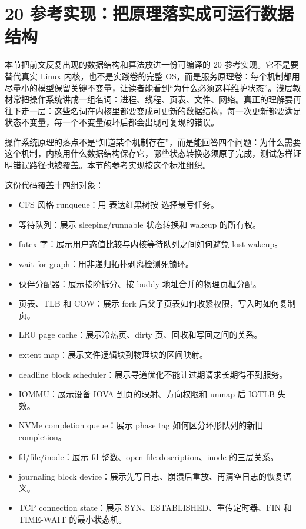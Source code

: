 \section{\cpp{}20 参考实现：把原理落实成可运行数据结构}

本节把前文反复出现的数据结构和算法放进一份可编译的 \cpp{}20 参考实现。它不是要替代真实 Linux 内核，也不是实践卷的完整 OS，而是服务原理卷：每个机制都用尽量小的模型保留关键不变量，让读者能看到“为什么必须这样维护状态”。浅层教材常把操作系统讲成一组名词：进程、线程、页表、文件、网络。真正的理解要再往下走一层：这些名词在内核里都要变成可更新的数据结构，每一次更新都要满足状态不变量，每一个不变量破坏后都会出现可复现的错误。

\begin{keyidea}
操作系统原理的落点不是“知道某个机制存在”，而是能回答四个问题：为什么需要这个机制，内核用什么数据结构保存它，哪些状态转换必须原子完成，测试怎样证明错误路径也被覆盖。本节的参考实现按这个标准组织。
\end{keyidea}

这份代码覆盖十四组对象：

\begin{itemize}
\tightlist
\item CFS 风格 runqueue：用  表达红黑树按  选择最亏任务。
\item 等待队列：展示 sleeping/runnable 状态转换和 wakeup 的所有权。
\item futex 字：展示用户态值比较与内核等待队列之间如何避免 lost wakeup。
\item wait-for graph：用非递归拓扑剥离检测死锁环。
\item 伙伴分配器：展示按阶拆分、按 buddy 地址合并的物理页框分配。
\item 页表、TLB 和 COW：展示 fork 后父子页表如何收紧权限，写入时如何复制页。
\item LRU page cache：展示冷热页、dirty 页、回收和写回之间的关系。
\item extent map：展示文件逻辑块到物理块的区间映射。
\item deadline block scheduler：展示寻道优化不能让过期请求长期得不到服务。
\item IOMMU：展示设备 IOVA 到页的映射、方向权限和 unmap 后 IOTLB 失效。
\item NVMe completion queue：展示 phase tag 如何区分环形队列的新旧 completion。
\item fd/file/inode：展示 fd 整数、open file description、inode 的三层关系。
\item journaling block device：展示先写日志、崩溃后重放、再清空日志的恢复语义。
\item TCP connection state：展示 SYN、ESTABLISHED、重传定时器、FIN 和 TIME-WAIT 的最小状态机。
\end{itemize}

